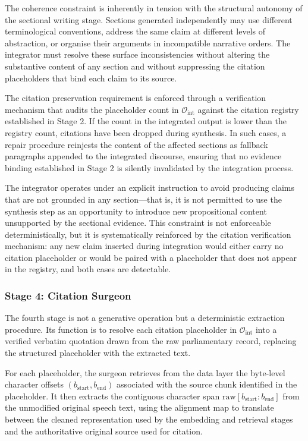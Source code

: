 The coherence constraint is inherently in tension with the structural autonomy of the sectional
writing stage. Sections generated independently may use different terminological conventions,
address the same claim at different levels of abstraction, or organise their arguments in
incompatible narrative orders. The integrator must resolve these surface inconsistencies without
altering the substantive content of any section and without suppressing the citation placeholders
that bind each claim to its source.

The citation preservation requirement is enforced through a verification mechanism that audits
the placeholder count in $\mathcal{O}_\text{int}$ against the citation registry established in
Stage 2. If the count in the integrated output is lower than the registry count, citations have
been dropped during synthesis. In such cases, a repair procedure reinjests the content of the
affected sections as fallback paragraphs appended to the integrated discourse, ensuring that no
evidence binding established in Stage 2 is silently invalidated by the integration process.

The integrator operates under an explicit instruction to avoid producing claims that are not
grounded in any section---that is, it is not permitted to use the synthesis step as an
opportunity to introduce new propositional content unsupported by the sectional evidence. This
constraint is not enforceable deterministically, but it is systematically reinforced by the
citation verification mechanism: any new claim inserted during integration would either carry
no citation placeholder or would be paired with a placeholder that does not appear in the
registry, and both cases are detectable.

\subsubsection{Stage 4: Citation Surgeon}

The fourth stage is not a generative operation but a deterministic extraction procedure. Its
function is to resolve each citation placeholder in $\mathcal{O}_\text{int}$ into a verified
verbatim quotation drawn from the raw parliamentary record, replacing the structured placeholder
with the extracted text.

For each placeholder, the surgeon retrieves from the data layer the byte-level character
offsets $(b_\text{start}, b_\text{end})$ associated with the source chunk identified in the
placeholder. It then extracts the contiguous character span
$\text{raw}[b_\text{start} : b_\text{end}]$ from the unmodified original speech text, using
the alignment map to translate between the cleaned representation used by the embedding and
retrieval stages and the authoritative original source used for citation.


